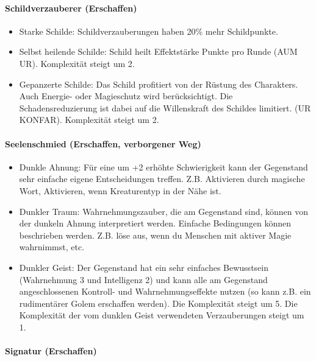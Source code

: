 \documentclass{article}
\begin{document}
\paragraph{Schildverzauberer (Erschaffen)}

\begin{itemize}
\item Starke Schilde: Schildverzauberungen haben 20\% mehr Schildpunkte.
\item Selbst heilende Schilde: Schild heilt Effektstärke Punkte pro Runde (AUM UR). Komplexität steigt um 2.
\item Gepanzerte Schilde: Das Schild profitiert von der Rüstung des Charakters. Auch Energie- oder Magieschutz wird berücksichtigt. Die Schadensreduzierung ist dabei auf die Willenskraft des Schildes limitiert. (UR KONFAR). Komplexität steigt um 2.
\end{itemize}

\paragraph{Seelenschmied (Erschaffen, verborgener Weg)}

\begin{itemize}
\item Dunkle Ahnung: Für eine um +2 erhöhte Schwierigkeit kann der Gegenstand sehr einfache eigene Entscheidungen treffen. Z.B. Aktivieren durch magische Wort, Aktivieren, wenn Kreaturentyp in der Nähe ist.
\item Dunkler Traum: Wahrnehmungszauber, die am Gegenstand sind, können von der dunkeln Ahnung interpretiert werden. Einfache Bedingungen können beschrieben werden. Z.B. löse aus, wenn du Menschen mit aktiver Magie wahrnimmst, etc.
\item Dunkler Geist: Der Gegenstand hat ein sehr einfaches Bewusstsein (Wahrnehmung 3 und Intelligenz 2) und kann alle am Gegenstand angeschlossenen Kontroll- und Wahrnehmungseffekte nutzen (so kann z.B. ein rudimentärer Golem erschaffen werden). Die Komplexität steigt um 5. Die Komplexität der vom dunklen Geist verwendeten Verzauberungen steigt um 1.
\end{itemize}

\paragraph{Signatur (Erschaffen)}
\end{document}
